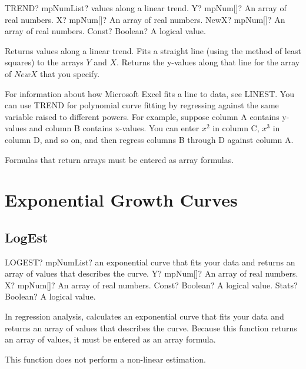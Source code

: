 \begin{mpFunctionsExtract}
	\mpWorksheetFunctionFourNotImplemented
	{TREND? mpNumList? values along a linear trend.}
	{Y? mpNum[]? An array of real numbers.}
	{X? mpNum[]? An array of real numbers.}
	{NewX? mpNum[]? An array of real numbers.}
	{Const? Boolean? A logical value.}
\end{mpFunctionsExtract}

\vspace{0.3cm}
Returns values along a linear trend. Fits a straight line (using the method of least squares) to the arrays $Y$ and $X$. Returns the y-values along that line for the array of $NewX$ that you specify.

For information about how Microsoft Excel fits a line to data, see LINEST.
You can use TREND for polynomial curve fitting by regressing against the same variable raised to different powers. For example, suppose column A contains y-values and column B contains x-values. You can enter $x^2$ in column C, $x^3$ in column D, and so on, and then regress columns B through D against column A.

Formulas that return arrays must be entered as array formulas.



\newpage
\section{Exponential Growth Curves}

\subsection{LogEst}

\begin{mpFunctionsExtract}
	\mpWorksheetFunctionFourNotImplemented
	{LOGEST? mpNumList? an exponential curve that fits your data and returns an array of values that describes the curve.}
	{Y? mpNum[]? An array of real numbers.}
	{X? mpNum[]? An array of real numbers.}
	{Const? Boolean? A logical value.}
	{Stats? Boolean? A logical value.}
\end{mpFunctionsExtract}

\vspace{0.3cm}
In regression analysis, calculates an exponential curve that fits your data and returns an array of values that describes the curve. Because this function returns an array of values, it must be entered as an array formula.

This function does not perform a non-linear estimation.



